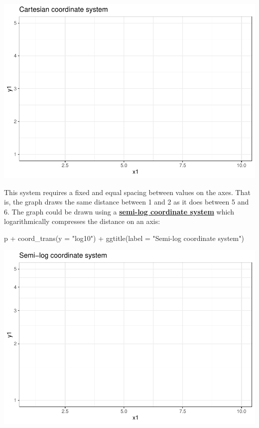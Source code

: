 \documentclass[
]{article}
\newenvironment{Shaded}{\begin{snugshade}}{\end{snugshade}}
\newcommand{\AttributeTok}[1]{\textcolor[rgb]{0.77,0.63,0.00}{#1}}
\newcommand{\FunctionTok}[1]{\textcolor[rgb]{0.00,0.00,0.00}{#1}}
\newcommand{\NormalTok}[1]{#1}
\newcommand{\SpecialCharTok}[1]{\textcolor[rgb]{0.00,0.00,0.00}{#1}}
\newcommand{\StringTok}[1]{\textcolor[rgb]{0.31,0.60,0.02}{#1}}
\begin{document}
\includegraphics{Grammar-of-Graphics_files/figure-latex/coord_cart-1.pdf}

This system requires a fixed and equal spacing between values on the
axes. That is, the graph draws the same distance between 1 and 2 as it
does between 5 and 6. The graph could be drawn using a
\href{https://en.wikipedia.org/wiki/Semi-log_plot}{\textbf{semi-log
coordinate system}} which logarithmically compresses the distance on an
axis:

\begin{Shaded}
\begin{Highlighting}[]
\NormalTok{p }\SpecialCharTok{+}
  \FunctionTok{coord\_trans}\NormalTok{(}\AttributeTok{y =} \StringTok{"log10"}\NormalTok{) }\SpecialCharTok{+}
  \FunctionTok{ggtitle}\NormalTok{(}\AttributeTok{label =} \StringTok{"Semi{-}log coordinate system"}\NormalTok{)}
\end{Highlighting}
\end{Shaded}

\includegraphics{Grammar-of-Graphics_files/figure-latex/coord_semi_log-1.pdf}
\end{document}
